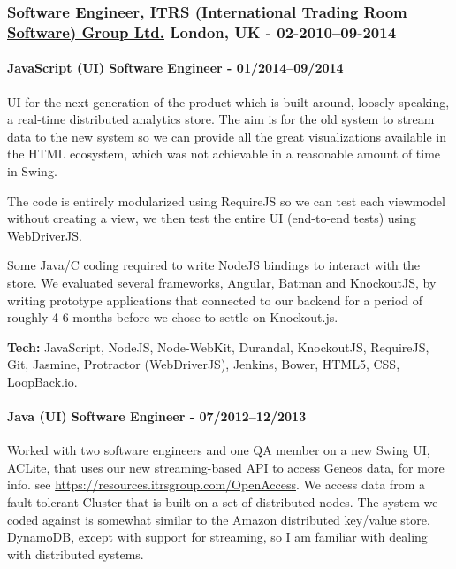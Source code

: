 \documentclass[
  a4paper,
]{article}
\begin{document}
\hypertarget{software-engineer-itrs-international-trading-room-software-group-ltd.-london-uk---02-201009-2014}{%
\subsubsection{\texorpdfstring{Software Engineer,
\href{https://www.itrsgroup.com}{ITRS (International Trading Room
Software) Group Ltd.} London, UK -
02-2010--09-2014}{Software Engineer, ITRS (International Trading Room Software) Group Ltd. London, UK - 02-2010--09-2014}}\label{software-engineer-itrs-international-trading-room-software-group-ltd.-london-uk---02-201009-2014}}

\hypertarget{javascript-ui-software-engineer---012014092014}{%
\paragraph{JavaScript (UI) Software Engineer -
01/2014--09/2014}\label{javascript-ui-software-engineer---012014092014}}

UI for the next generation of the product which is built around, loosely
speaking, a real-time distributed analytics store. The aim is for the
old system to stream data to the new system so we can provide all the
great visualizations available in the HTML ecosystem, which was not
achievable in a reasonable amount of time in Swing.

The code is entirely modularized using RequireJS so we can test each
viewmodel without creating a view, we then test the entire UI
(end-to-end tests) using WebDriverJS.

Some Java/C coding required to write NodeJS bindings to interact with
the store. We evaluated several frameworks, Angular, Batman and
KnockoutJS, by writing prototype applications that connected to our
backend for a period of roughly 4-6 months before we chose to settle on
Knockout.js.

\textbf{Tech:} JavaScript, NodeJS, Node-WebKit, Durandal, KnockoutJS,
RequireJS, Git, Jasmine, Protractor (WebDriverJS), Jenkins, Bower,
HTML5, CSS, LoopBack.io.

\hypertarget{java-ui-software-engineer---072012122013}{%
\paragraph{Java (UI) Software Engineer -
07/2012--12/2013}\label{java-ui-software-engineer---072012122013}}

Worked with two software engineers and one QA member on a new Swing UI,
ACLite, that uses our new streaming-based API to access Geneos data, for
more info. see \url{https://resources.itrsgroup.com/OpenAccess}. We
access data from a fault-tolerant Cluster that is built on a set of
distributed nodes. The system we coded against is somewhat similar to
the Amazon distributed key/value store, DynamoDB, except with support
for streaming, so I am familiar with dealing with distributed systems.
\end{document}
